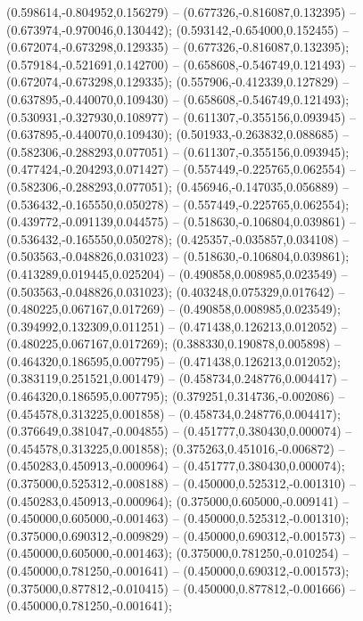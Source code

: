  (0.598614,-0.804952,0.156279) -- (0.677326,-0.816087,0.132395) -- (0.673974,-0.970046,0.130442);
 (0.593142,-0.654000,0.152455) -- (0.672074,-0.673298,0.129335) -- (0.677326,-0.816087,0.132395);
 (0.579184,-0.521691,0.142700) -- (0.658608,-0.546749,0.121493) -- (0.672074,-0.673298,0.129335);
 (0.557906,-0.412339,0.127829) -- (0.637895,-0.440070,0.109430) -- (0.658608,-0.546749,0.121493);
 (0.530931,-0.327930,0.108977) -- (0.611307,-0.355156,0.093945) -- (0.637895,-0.440070,0.109430);
 (0.501933,-0.263832,0.088685) -- (0.582306,-0.288293,0.077051) -- (0.611307,-0.355156,0.093945);
 (0.477424,-0.204293,0.071427) -- (0.557449,-0.225765,0.062554) -- (0.582306,-0.288293,0.077051);
 (0.456946,-0.147035,0.056889) -- (0.536432,-0.165550,0.050278) -- (0.557449,-0.225765,0.062554);
 (0.439772,-0.091139,0.044575) -- (0.518630,-0.106804,0.039861) -- (0.536432,-0.165550,0.050278);
 (0.425357,-0.035857,0.034108) -- (0.503563,-0.048826,0.031023) -- (0.518630,-0.106804,0.039861);
 (0.413289,0.019445,0.025204) -- (0.490858,0.008985,0.023549) -- (0.503563,-0.048826,0.031023);
 (0.403248,0.075329,0.017642) -- (0.480225,0.067167,0.017269) -- (0.490858,0.008985,0.023549);
 (0.394992,0.132309,0.011251) -- (0.471438,0.126213,0.012052) -- (0.480225,0.067167,0.017269);
 (0.388330,0.190878,0.005898) -- (0.464320,0.186595,0.007795) -- (0.471438,0.126213,0.012052);
 (0.383119,0.251521,0.001479) -- (0.458734,0.248776,0.004417) -- (0.464320,0.186595,0.007795);
 (0.379251,0.314736,-0.002086) -- (0.454578,0.313225,0.001858) -- (0.458734,0.248776,0.004417);
 (0.376649,0.381047,-0.004855) -- (0.451777,0.380430,0.000074) -- (0.454578,0.313225,0.001858);
 (0.375263,0.451016,-0.006872) -- (0.450283,0.450913,-0.000964) -- (0.451777,0.380430,0.000074);
 (0.375000,0.525312,-0.008188) -- (0.450000,0.525312,-0.001310) -- (0.450283,0.450913,-0.000964);
 (0.375000,0.605000,-0.009141) -- (0.450000,0.605000,-0.001463) -- (0.450000,0.525312,-0.001310);
 (0.375000,0.690312,-0.009829) -- (0.450000,0.690312,-0.001573) -- (0.450000,0.605000,-0.001463);
 (0.375000,0.781250,-0.010254) -- (0.450000,0.781250,-0.001641) -- (0.450000,0.690312,-0.001573);
 (0.375000,0.877812,-0.010415) -- (0.450000,0.877812,-0.001666) -- (0.450000,0.781250,-0.001641);
